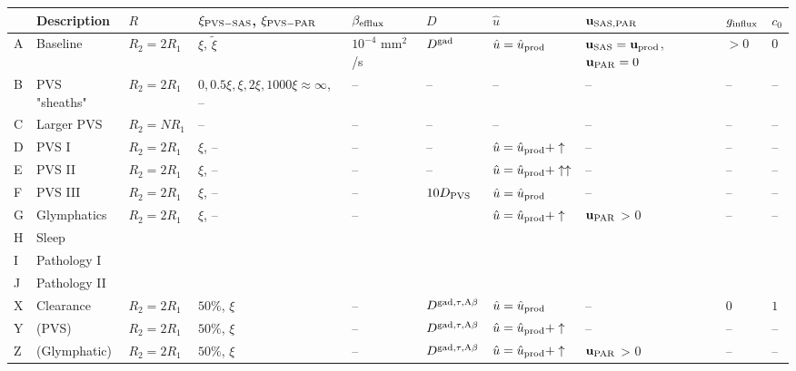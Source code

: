 \begin{table}
\begin{center}
  \begin{tabular}{ll|llllll|ll}
    \toprule
    & Description & $R$ & $\xi_{\rm PVS-SAS}$, $\xi_{\rm PVS-PAR}$ & $\beta_{\rm efflux}$ & $D$ & $\hat{u}$ & $\mathbf{u}_{\rm SAS, PAR}$ & $g_{\rm influx}$ & $c_0$ \\
    \midrule
    A & Baseline  & $R_2 = 2 R_1$ & $\xi$, $\tilde \xi$\cite{koch2023estimates} &  $10^{-4}$ mm$^2$/s\cite{hornkjol2022csf} & $D^{\rm gad}$\cite{sykova2008diffusion, valnes2020apparent}  & $\hat{u} = \hat{u}_{\rm prod}$ & $\mathbf{u}_{\rm SAS} = \mathbf{u}_{\rm prod}$, $\mathbf{u}_{\rm PAR} = 0$ & $> 0$ & 0 \\
    B & PVS "sheaths" & $R_2 = 2 R_1$ & $0, 0.5 \xi, \xi, 2 \xi, 1000 \xi \approx \infty$, --\cite{koch2023estimates} & -- & --  &  --  & --  & -- & -- \\
    C & Larger PVS & $R_2 = N R_1$ & -- & -- & --  &  --  & -- & -- & -- \\
    D & PVS I & $R_2 = 2 R_1$ & $\xi$, -- & -- & --  &  $\hat{u} = \hat{u}_{\rm prod} + \uparrow$  & -- & -- & -- \\
    E & PVS II & $R_2 = 2 R_1$ & $\xi$, -- & -- & --  &  $\hat{u} = \hat{u}_{\rm prod} + \uparrow\uparrow$  & -- & -- & -- \\
    F & PVS III & $R_2 = 2 R_1$ & $\xi$, -- & -- & $10 D_{\rm PVS}$ &  $\hat{u} = \hat{u}_{\rm prod}$  & -- & -- & -- \\
    G & Glymphatics & $R_2 = 2 R_1$ & $\xi$, -- & -- & \cite{sykova2008diffusion, valnes2020apparent} &  $\hat{u} = \hat{u}_{\rm prod} + \uparrow$  & $\mathbf{u}_{\rm PAR}$ > 0 & -- & -- \\
    H & Sleep &  &  & &  &  &  & & \\
    I & Pathology I &  &  & &  &  &  & & \\
    J & Pathology II &  &  & &  &  &  & & \\
    \midrule
    X & Clearance & $R_2 = 2 R_1$ & $50\%$, $\xi$ & -- & $D^{\rm gad, \tau, A\beta}$  &  $\hat{u} = \hat{u}_{\rm prod}$  & -- & $0$ & $1$ \\
    Y & (PVS) & $R_2 = 2 R_1$ & $50\%$, $\xi$ & -- & $D^{\rm gad, \tau, A\beta}$  &  $\hat{u} = \hat{u}_{\rm prod} + \uparrow$  & -- & -- & -- \\
    Z & (Glymphatic) & $R_2 = 2 R_1$ & $50\%$, $\xi$ & -- & $D^{\rm gad, \tau, A\beta}$  &  $\hat{u} = \hat{u}_{\rm prod} + \uparrow$  & $\mathbf{u}_{\rm PAR}$ > 0 & -- & -- \\

\end{tabular}
\end{center}
\end{table}
